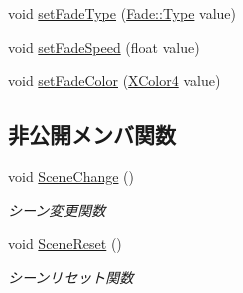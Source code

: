 \begin{DoxyCompactItemize}
\item 
void \mbox{\hyperlink{class_scene_manager_a95bb32ee4d3461bf56381d288a98c61b}{set\+Fade\+Type}} (\mbox{\hyperlink{class_fade_ac06f27215b454aa05b93c236476d6e80}{Fade\+::\+Type}} value)
\item 
void \mbox{\hyperlink{class_scene_manager_af3b87ef963b80aa1942a2f804f61bdeb}{set\+Fade\+Speed}} (float value)
\item 
void \mbox{\hyperlink{class_scene_manager_a24e7fa08c34ecacdca37ee35c5c39141}{set\+Fade\+Color}} (\mbox{\hyperlink{_vector3_d_8h_a680c30c4a07d86fe763c7e01169cd6cc}{X\+Color4}} value)
\end{DoxyCompactItemize}
\subsection*{非公開メンバ関数}
\begin{DoxyCompactItemize}
\item 
void \mbox{\hyperlink{class_scene_manager_ab1ffc5d84cf812e4105cba755d034770}{Scene\+Change}} ()
\begin{DoxyCompactList}\small\item\em シーン変更関数 \end{DoxyCompactList}\item 
void \mbox{\hyperlink{class_scene_manager_a0652a81c7baff52add9ec4b13205865c}{Scene\+Reset}} ()
\begin{DoxyCompactList}\small\item\em シーンリセット関数 \end{DoxyCompactList}\end{DoxyCompactItemize}
